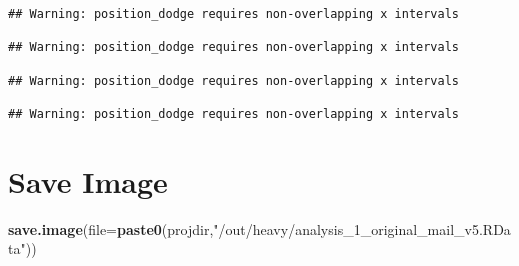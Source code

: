 \documentclass[
]{article}
\newenvironment{Shaded}{\begin{snugshade}}{\end{snugshade}}
\newcommand{\DataTypeTok}[1]{\textcolor[rgb]{0.13,0.29,0.53}{#1}}
\newcommand{\KeywordTok}[1]{\textcolor[rgb]{0.13,0.29,0.53}{\textbf{#1}}}
\newcommand{\NormalTok}[1]{#1}
\newcommand{\StringTok}[1]{\textcolor[rgb]{0.31,0.60,0.02}{#1}}
\begin{document}
\begin{verbatim}
## Warning: position_dodge requires non-overlapping x intervals

## Warning: position_dodge requires non-overlapping x intervals

## Warning: position_dodge requires non-overlapping x intervals

## Warning: position_dodge requires non-overlapping x intervals
\end{verbatim}

\hypertarget{save-image}{%
\section{Save Image}\label{save-image}}

\begin{Shaded}
\begin{Highlighting}[]
\KeywordTok{save.image}\NormalTok{(}\DataTypeTok{file=}\KeywordTok{paste0}\NormalTok{(projdir,}\StringTok{"/out/heavy/analysis_1_original_mail_v5.RData"}\NormalTok{))}
\end{Highlighting}
\end{Shaded}
\end{document}
